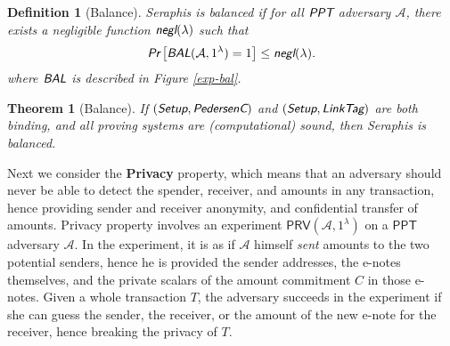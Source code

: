 \documentclass{article}
\newtheorem{definition}{Definition}[section]
\newtheorem{theorem}{Theorem}[section]
\begin{document}
\begin{definition}[Balance]
Seraphis is balanced if for all $\emph{\textsf{PPT}}$ adversary $\mathcal{A}$, there exists a negligible function $\emph{\textsf{negl}}(\lambda)$ such that
\begin{align*}
\emph{\textsf{Pr}}
\left[
\emph{\textsf{BAL}}(\mathcal{A}, 1^{\lambda})=1
\right]
\le \emph{\textsf{negl}}(\lambda).
\end{align*}
where $\emph{\textsf{BAL}}$ is described in Figure \ref{exp-bal}.
\end{definition}
\begin{theorem}[Balance]\label{thm-bal}
If $(\emph{\textsf{Setup}},\emph{\textsf{PedersenC}})$ and $(\emph{\textsf{Setup}},\emph{\textsf{LinkTag}})$ are both binding, and all proving systems are (computational) sound, then Seraphis is balanced.  
\end{theorem}
Next we consider the \textbf{Privacy} property, which means that an adversary should never be able to detect the spender, receiver, and amounts in any transaction, hence providing sender and receiver anonymity, and confidential transfer of amounts. Privacy property involves an experiment $\textsf{PRV}(\mathcal{A}, 1^{\lambda})$ on a $\textsf{PPT}$ adversary $\mathcal{A}$. In the experiment, it is as if $\mathcal{A}$ himself \textit{sent} amounts to the two potential senders, hence he is provided the sender addresses, the e-notes themselves, and the private scalars of the amount commitment $C$ in those e-notes. Given a whole transaction $T$, the adversary succeeds in the experiment if she can guess the sender, the receiver, or the amount of the new e-note for the receiver, hence breaking the privacy of $T$.
\end{document}
